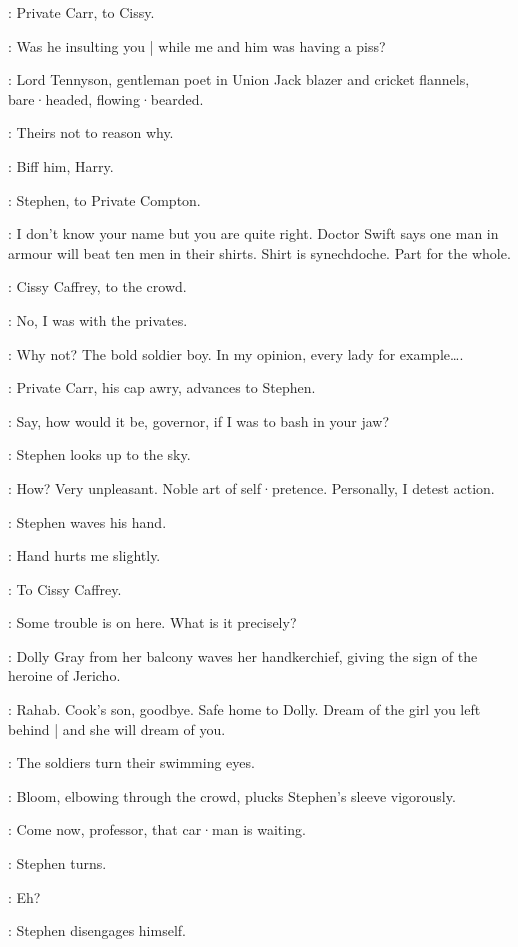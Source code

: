 :
Private Carr,
to Cissy.

\Carr:
Was he insulting you |
while me and him was having a piss?

:
Lord Tennyson,
gentleman poet in Union Jack blazer and cricket flannels,
bare·headed,
flowing·bearded.

\LordTennyson:
Theirs not to reason why.

\Compton:
Biff him,
Harry.

:
Stephen,
to Private Compton.

\Stephen:
I don't know your name but you are quite right.
Doctor Swift says one man in armour will beat ten men in their shirts.
Shirt is synechdoche.
Part for the whole.

:
Cissy Caffrey,
to the crowd.

\Cissy:
No,
I was with the privates.

\Stephen:
Why not?
The bold soldier boy.
In my opinion,
every lady for example….

:
Private Carr,
his cap awry,
advances to Stephen.

\Carr:
Say,
how would it be,
governor,
if I was to bash in your jaw?

:
Stephen looks up to the sky.

\Stephen:
How?
Very unpleasant.
Noble art of self·pretence.
Personally,
I detest action.

:
Stephen waves his hand.

\Stephen:
Hand hurts me slightly.

:
To Cissy Caffrey.

\Stephen:
Some trouble is on here.
What is it precisely?

:
Dolly Gray from her balcony waves her handkerchief,
giving the sign of the heroine of Jericho.

\DollyGray:
Rahab.
Cook's son,
goodbye.
Safe home to Dolly.
Dream of the girl you left behind |
%
and she will dream of you.

:
The soldiers turn their swimming eyes.

:
Bloom,
elbowing through the crowd,
plucks Stephen's sleeve vigorously.

\Bloom:
Come now,
professor,
that car·man is waiting.

:
Stephen turns.

\Stephen:
Eh?

:
Stephen disengages himself.

